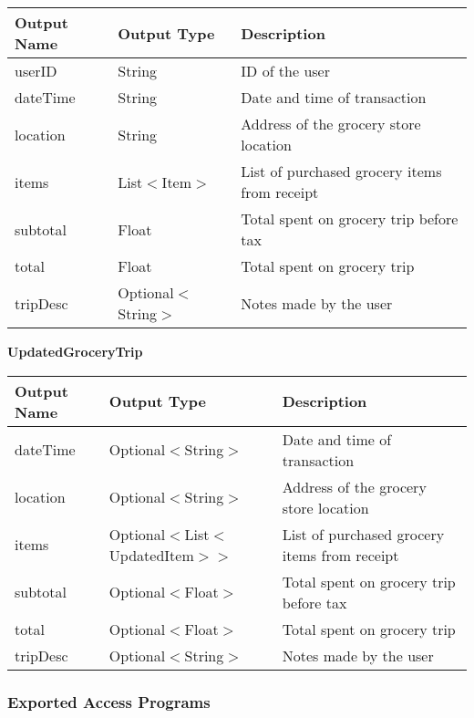 \documentclass[12pt, titlepage]{article}
\begin{document}
\begin{table}[H]
  \begin{tabular}{|p{}|p{}|p{}|}
    \hline
    \textbf{Output Name} & \textbf{Output Type} & \textbf{Description} \\
    \hline
    userID & String & ID of the user \\
    \hline
    dateTime & String & Date and time of transaction \\
    \hline
    location & String & Address of the grocery store location \\
    \hline
    items & List$<$Item$>$ & List of purchased grocery items from receipt \\
    \hline
    subtotal & Float & Total spent on grocery trip before tax \\
    \hline
    total & Float & Total spent on grocery trip \\
    \hline
    tripDesc & Optional$<$String$>$ & Notes made by the user \\
    \hline
  \end{tabular}
\end{table}

\textbf{UpdatedGroceryTrip}

\begin{table}[H]
  \begin{tabular}{|p{}|p{}|p{}|}
    \hline
    \textbf{Output Name} & \textbf{Output Type} & \textbf{Description} \\
    \hline
    dateTime & Optional$<$String$>$ & Date and time of transaction \\
    \hline
    location & Optional$<$String$>$ & Address of the grocery store location \\
    \hline
    items & Optional$<$List$<$UpdatedItem$>$$>$ & List of purchased grocery items from receipt \\
    \hline
    subtotal & Optional$<$Float$>$ & Total spent on grocery trip before tax \\
    \hline
    total & Optional$<$Float$>$ & Total spent on grocery trip \\
    \hline
    tripDesc & Optional$<$String$>$ & Notes made by the user \\
    \hline
  \end{tabular}
\end{table}

\subsubsection{Exported Access Programs}
\end{document}
